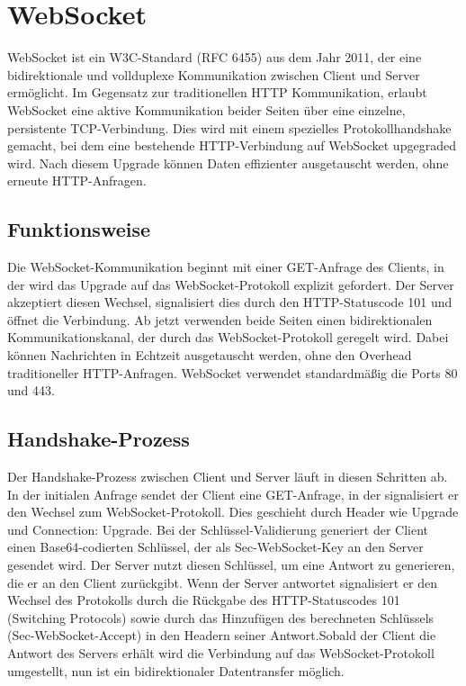 \chapter{WebSocket}
WebSocket ist ein W3C-Standard (RFC 6455) aus dem Jahr 2011, der eine bidirektionale und vollduplexe Kommunikation zwischen Client und Server ermöglicht. Im Gegensatz zur traditionellen HTTP Kommunikation, erlaubt WebSocket eine aktive Kommunikation beider Seiten über eine einzelne, persistente TCP-Verbindung. Dies wird mit einem spezielles Protokollhandshake gemacht, bei dem eine bestehende HTTP-Verbindung auf WebSocket upgegraded wird. Nach diesem Upgrade können Daten effizienter ausgetauscht werden, ohne erneute HTTP-Anfragen. \autocite{WebSocketW3C} \autocite{WebSocketHeise}

\section{Funktionsweise}
Die WebSocket-Kommunikation beginnt mit einer GET-Anfrage des Clients, in der wird das Upgrade auf das WebSocket-Protokoll explizit gefordert. Der Server akzeptiert diesen Wechsel, signalisiert dies durch den HTTP-Statuscode 101 und öffnet die Verbindung. Ab jetzt verwenden beide Seiten einen bidirektionalen Kommunikationskanal, der durch das WebSocket-Protokoll geregelt wird. Dabei können Nachrichten in Echtzeit ausgetauscht werden, ohne den Overhead traditioneller HTTP-Anfragen. WebSocket verwendet standardmäßig die Ports 80 und 443. \autocite{WebSocketW3C}

\section{Handshake-Prozess}
Der Handshake-Prozess zwischen Client und Server läuft in diesen Schritten ab. In der initialen Anfrage sendet der Client eine GET-Anfrage, in der signalisiert er den Wechsel zum WebSocket-Protokoll. Dies geschieht durch Header wie Upgrade und Connection: Upgrade. Bei der Schlüssel-Validierung generiert der Client einen Base64-codierten Schlüssel, der als Sec-WebSocket-Key an den Server gesendet wird. Der Server nutzt diesen Schlüssel, um eine Antwort zu generieren, die er an den Client zurückgibt. Wenn der Server antwortet signalisiert er den Wechsel des Protokolls durch die Rückgabe des HTTP-Statuscodes 101 (Switching Protocols) sowie durch das Hinzufügen des berechneten Schlüssels (Sec-WebSocket-Accept) in den Headern seiner Antwort.Sobald der Client die Antwort des Servers erhält wird die Verbindung auf das WebSocket-Protokoll umgestellt, nun ist ein bidirektionaler Datentransfer möglich. \autocite{WebSocketHeise}

